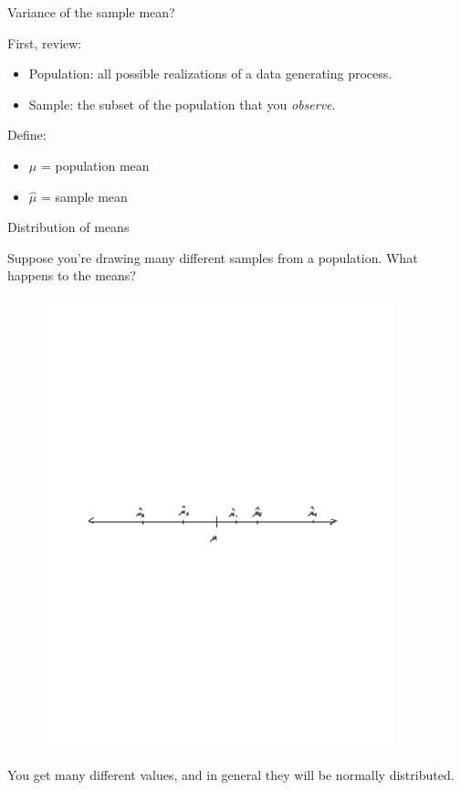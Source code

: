 \documentclass[aspectratio=169]{beamer}
\begin{document}
\begin{frame}{Variance of the sample mean?}

First, review:
\begin{itemize}
\item Population: all possible realizations of a data generating process.  
\item Sample: the subset of the population that you \textit{observe}.  
\end{itemize}

Define:
\begin{itemize}
\item $\mu$ = population mean
\item $\hat{\mu}$ = sample mean
\end{itemize}

\end{frame}

\begin{frame}{Distribution of means}

Suppose you're drawing many different samples from a population.  What happens to the means?
\pause
\begin{figure}
\includegraphics[width=0.9\textwidth]{pop-sample-mean}
\end{figure}

You get many different values, and in general they will be normally distributed.

\end{frame}
\end{document}
